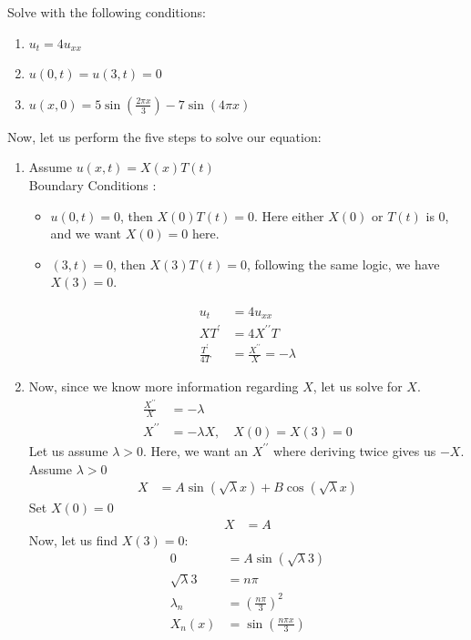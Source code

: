\documentclass{article}
\begin{document}
\ex Solve with the following conditions:
\begin{enumerate}
  \item $u_t = 4u_{xx}$
  \item $u(0, t) = u(3, t) = 0$
  \item $u(x, 0) = 5 \sin \left( \frac{2 \pi x}{3} \right) - 7 \sin(4 \pi x)$
\end{enumerate}
Now, let us perform the five steps to solve our equation:
\begin{enumerate}
  \item Assume $u(x, t) = X(x)T(t)$\\
  Boundary Conditions :
  \begin{itemize}
    \item $u(0, t) = 0$, then $X(0)T(t) = 0$. Here either $X(0)$ or $T(t)$ is $0$, and we want $X(0) = 0$ here.
    \item $(3, t) = 0$, then $X(3)T(t) = 0$, following the same logic, we have $X(3) = 0$.
  \end{itemize}
  \begin{align}
    u_t & = 4u_{xx}\\
    XT^\prime & = 4X^{\prime\prime}T\\
    \frac{T^\prime}{4T} & = \frac{X^{\prime\prime}}{X} = -\lambda
  \end{align}
  \item Now, since we know more information regarding $X$, let us solve for $X$.
  \begin{align}
    \frac{X^{\prime\prime}}{X} & = -\lambda\\
    X^{\prime\prime} & = -\lambda X, \quad X(0) = X(3) = 0
  \end{align}
  Let us assume $\lambda > 0$. Here, we want an $X^{\prime\prime}$ where deriving twice gives us $-X$. Assume $\lambda > 0$
  \begin{align}
    X & = A\sin(\sqrt \lambda x) + B \cos(\sqrt \lambda x)
  \end{align}
  Set $X(0) = 0$
  \begin{align}
    X & = A
  \end{align}
  Now, let us find $X(3) = 0$:
  \begin{align}
    0 & = A\sin(\sqrt \lambda 3)\\
    \sqrt \lambda 3 & = n \pi\\
    \lambda_n & = \left( \frac{n \pi}{3} \right)^2\\
    X_n(x) & = \sin \left(\frac{n \pi x}{3} \right)
  \end{align}

\end{enumerate}
\end{document}
